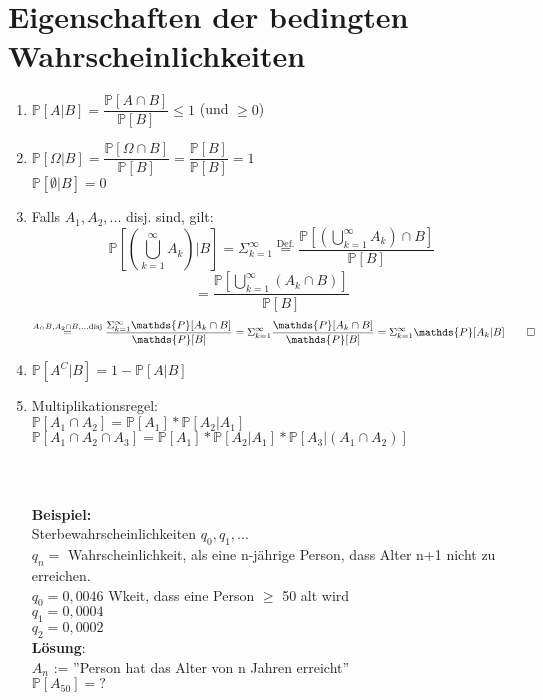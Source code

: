 \section{Eigenschaften der bedingten Wahrscheinlichkeiten}
\begin{enumerate}
	\item $\mathds{P}[A \vert B] = \dfrac{\mathds{P}[A \cap B]}{\mathds{P}[B]} \leq 1 $ (und $\geq 0$)
	\item $\mathds{P}[\Omega\vert B] = \dfrac{\mathds{P}[\Omega \cap B]}{\mathds{P}[B]}= \dfrac{\mathds{P}[B]}{\mathds{P}[B]} = 1$
	\\ $\mathds{P}[\emptyset \vert B] = 0$
	\item Falls $A_1,A_2,...$ disj. sind, gilt:
	$$\mathds{P}\left[\left(\bigcup_{k=1}^\infty A_k\right)\vert B\right] = \Sigma_{k=1}^\infty \overset{\text{Def.}}{=} \dfrac{\mathds{P}\left[\left(\bigcup_{k=1}^\infty A_k\right)\cap B\right]}{\mathds{P}[B]}$$
	$$= \dfrac{\mathds{P}\left[\bigcup_{k=1}^\infty(A_k \cap B)\right]}{\mathds{P}[B]}$$
	$$\overset{A_\cap B ,A_2 \cap B,... \text{disj}}{=} \dfrac{\Sigma_{k=1}^\infty \mathds{P}[A_k \cap B]}{\mathds{P}[B]} = \Sigma_{k=1}^\infty \dfrac{\mathds{P}[A_k \cap B]}{\mathds{P}[B]} = \Sigma_{k=1}^\infty \mathds{P}[A_k \vert B] \qed$$
	\item $\mathds{P}[A^C\vert B] = 1 - \mathds{P}[A\vert B]$
	\item Multiplikationsregel:\medskip\\$\mathds{P}[A_1\cap A_2] = \mathds{P}[A_1]*\mathds{P}[A_2\vert A_1]$\smallskip\\
	$\mathds{P}[A_1\cap A_2\cap A_3] = \mathds{P}[A_1] * \mathds{P}[A_2 \vert A_1]* \mathds{P}[A_3 \vert (A_1 \cap A_2)]$\\\\\\\\
	\textbf{Beispiel:}\\
	Sterbewahrscheinlichkeiten $q_0,q_1,...$\\
	$q_n = $ Wahrscheinlichkeit, als eine n-jährige Person, dass Alter n+1 nicht zu erreichen.\smallskip\\
	$q_0 = 0,0046$ \hspace{2cm} Wkeit, dass eine Person $\geq$ 50 alt wird\\
	$q_1 = 0,0004$\\
	$q_2 = 0,0002$\smallskip\\
	\textbf{Lösung}:\smallskip\\
	$A_n$ := ''Person hat das Alter von n Jahren erreicht''\smallskip\\$\mathds{P}[A_{50}] = ?$\medskip\\

\end{enumerate}
